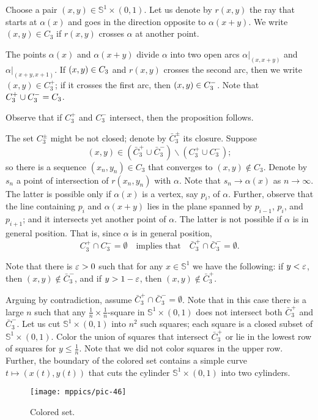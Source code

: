 Choose a pair $(x,y)\in \mathbb{S}^1\times (0,1)$.
Let us denote by $r(x,y)$ the ray that starts at $\alpha(x)$ and goes in the direction opposite to $\alpha(x+y)$.
We write $(x,y)\in C_3$ if $r(x,y)$ crosses $\alpha$ at another point.

The points $\alpha(x)$ and $\alpha(x+y)$ divide $\alpha$ into two open arcs $\alpha|_{(x,x+y)}$ and $\alpha|_{(x+y,x+1)}$.
If $(x,y)\z\in C_3$ and $r(x,y)$ crosses the second arc, then we write $(x,y)\in C_3^+$;
if it crosses the first arc, then $(x,y)\z\in C_3^-$.
Note that $C_3^+\cup C_3^-\z=C_3$.

Observe that if $C_3^+$ and $C_3^-$ intersect, then the proposition follows.

The set $C_3^\pm$ might be not closed;
denote by $\bar C_3^\pm$ its closure.
Suppose 
\[(x,y)\in (\bar C_3^+\cup\bar C_3^-)\backslash(C_3^+\cup C_3^-);\]
so there is a sequence $(x_n,y_n)\in C_3$ that converges to $(x,y)\notin C_3$.
Denote by $s_n$ a point of intersection of $r(x_n,y_n)$ with $\alpha$.
Note that $s_n\to \alpha(x)$ as $n\to\infty$.
The latter is possible only if $\alpha(x)$ is a vertex, say $p_i$, of $\alpha$.
Further, observe that the line containing $p_i$ and $\alpha(x+y)$ lies in the plane spanned by $p_{i-1}$, $p_i$, and $p_{i+1}$; and it intersects yet another point of $\alpha$.
The latter is not possible if $\alpha$ is in general position.
That is, since $\alpha$ is in general position, 
\[C_3^+\cap C_3^-=\emptyset\quad\text{implies that}\quad
\bar C_3^+\cap \bar C_3^-=\emptyset.\]

Note that there is $\varepsilon>0$ such that for any $x\in\mathbb{S}^1$ we have the following:
if $y<\varepsilon$, then $(x,y)\notin \bar C_3^-$,
and if $y>1-\varepsilon$, then $(x,y)\notin \bar C_3^+$.

Arguing by contradiction, assume $\bar C_3^+\cap \bar C_3^-=\emptyset$.
Note that in this case there is a large $n$ such that any $\tfrac1n\times\tfrac1n$-square in $\mathbb{S}^1\times (0,1)$ does not intersect both $\bar C_3^+$ and $\bar C_3^-$.
Let us cut $\mathbb{S}^1\times (0,1)$ into $n^2$ such squares; each square is a closed subset of $\mathbb{S}^1\times (0,1)$.
Color the union of squares that intersect $\bar C_3^+$ or lie in the lowest row of squares for $y\le \tfrac1n$.
Note that we did not color squares in the upper row.
Further, the boundary of the colored set contains a simple curve $t\mapsto(x(t),y(t))$ that cuts  the cylinder $\mathbb{S}^1\times (0,1)$ into two cylinders.

\begin{wrapfigure}{r}{24 mm}
\vskip-0mm
\centering
\texttt{[image: mppics/pic-46]}
\caption*{Colored set.}
\vskip0mm
\end{wrapfigure}

